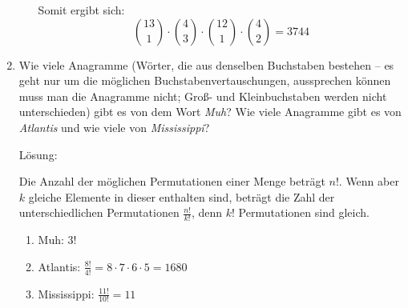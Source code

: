 \documentclass[main.tex]{subfiles}
\begin{document}
\begin{enumerate}
\begin{enumerate}
		            Somit ergibt sich:
		            \[ \binom{13}{1} \cdot \binom{4}{3} \cdot \binom{12}{1} \cdot \binom{4}{2}
			            = 3744 \]
	      \end{enumerate}
	\item Wie viele Anagramme (Wörter, die aus denselben Buchstaben bestehen – es
	      geht nur um die möglichen Buchstabenvertauschungen, aussprechen können
	      muss man die Anagramme nicht; Groß- und Kleinbuchstaben werden nicht
	      unterschieden) gibt es von dem Wort \textit{Muh}? Wie viele Anagramme gibt es
	      von \textit{Atlantis} und wie viele von \textit{Mississippi}?

		Lösung:
		
		Die Anzahl der möglichen Permutationen einer Menge beträgt \( n! \). 
		Wenn aber \( k \) gleiche Elemente in dieser enthalten sind, beträgt die 
		Zahl der unterschiedlichen Permutationen \( \frac{n!}{k!} \), denn 
		\( k! \) Permutationen sind gleich. 
	      \begin{enumerate}
		      \item Muh: \( 3! \)
		      \item Atlantis: \( \frac{8!}{4!} = 8 \cdot 7 \cdot 6 \cdot 5 = 1680 \)
		      \item Mississippi: \( \frac{11!}{10!} = 11 \)
	      \end{enumerate}
\end{enumerate}
\end{document}
